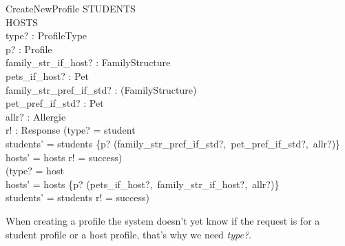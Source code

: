 \documentclass[11pt]{article}
\begin{document}
\begin{schema}{CreateNewProfile}
	\Delta STUDENTS\\
	\Delta HOSTS\\
	type? : ProfileType\\
	p? : Profile\\
	family\_str\_if\_host? : FamilyStructure\\
	pets\_if\_host? : \power Pet\\
	family\_str\_pref\_if\_std? : \power (\nat \rightarrow FamilyStructure)\\
	pet\_pref\_if\_std? : \power Pet\\
	allr? : \power Allergie\\
	r! : Response
\where
	(type? = student \wedge\\
	\indent students' = students \cup \{p? \mapsto (family\_str\_pref\_if\_std?,\ pet\_pref\_if\_std?,\ allr?)\} \wedge\\
	\indent hosts' = hosts \wedge r! = success)\ \vee\\
	(type? = host \wedge\\
	 \indent hosts' = hosts \cup \{p? \mapsto (pets\_if\_host?,\ family\_str\_if\_host?,\ allr?)\} \wedge\\
	 \indent students' = students \wedge r! = success)
\end{schema}
When creating a profile the system doesn't yet know if the request is for a student profile or a host profile, that's why we need \emph{type?}.
\end{document}
